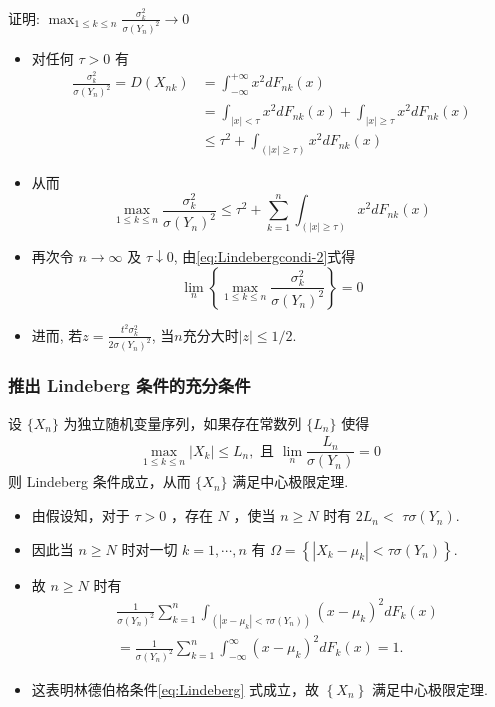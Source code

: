\begin{frame}{证明: $\max _{1 \leq k \leq n} \frac{\sigma_{k}^{2}}{\sigma(Y_n)^2}\rightarrow 0$}
	\vspace{-0.1cm}
\begin{itemize}
	\item 对任何 $\tau>0$ 有
\begin{align*}
	\frac{\sigma_{k}^{2}}{\sigma(Y_n)^2}=D\left(X_{n k}\right)&=\int_{-\infty}^{+\infty}x^2dF_{nk}(x)\\
	&=\int_{|x|<\tau}x^2dF_{nk}(x)+\int_{|x|\geq\tau}x^2dF_{nk}(x)\\
	&\leq \tau^{2}+\int_{(|x| \geq \tau)} x^{2} d F_{n k}(x)
\end{align*}
\item 从而
	\[
	\max _{1 \leq k \leq n} \frac{\sigma_{k}^{2}}{\sigma(Y_n)^2} \leq \tau^{2}+\sum_{k=1}^{n} \int_{(|x| \geq \tau)} x^{2} d F_{n k}(x)
	\]
\item
	再次令 $n \rightarrow \infty$ 及 $\tau \downarrow 0$, 由\eqref{eq:Lindebergcondi-2}式得
	\[
	\lim _{n}\left\{\max _{1 \leq k \leq n} \frac{\sigma_{k}^{2}}{\sigma(Y_n)^2}\right\}=0
	\]
	\item 进而, 若$z=\frac{t^{2} \sigma_{k}^{2}}{2 \sigma(Y_n)^2}$, 当$n$充分大时$|z| \leq 1 / 2$.
\end{itemize}

\end{frame}








\begin{frame}
	\frametitle{推出 Lindeberg 条件的充分条件}
	\begin{thm}
		设 $\{X_n\}$ 为独立随机变量序列，如果存在常数列 $\{L_n\}$ 使得
		\begin{eqnarray*}
			\max_{1\leq k\leq n}|X_k|\leq L_n, \mbox{ 且 } \lim_{n}\dfrac{L_n}{\sigma(Y_n)}=0
		\end{eqnarray*}
		则 Lindeberg 条件成立，从而 $\{X_n\}$ 满足中心极限定理.
	\end{thm}

\zheng
\begin{itemize}
	\item 由假设知，对于 $\tau>0$ ，存在 $N$ ，使当 $n \geq N$ 时有 $2 L_{n}<$ $\tau \sigma(Y_n)$.
	\item 因此当 $n \geq N$ 时对一切 $k=1, \cdots, n$ 有 $\Omega=\left\{\left|X_{k}-\mu_{k}\right|<\tau \sigma(Y_n)\right\}$.
	\item 故 $n \geq N$ 时有
	\begin{align*}
		&\frac{1}{\sigma(Y_n)^{2}} \sum_{k=1}^{n} \int_{\left(\left|x-\mu_{k}\right|<\tau \sigma(Y_n)\right)}\left(x-\mu_{k}\right)^{2} d F_{k}(x)\\
		&=\frac{1}{\sigma(Y_n)^{2}} \sum_{k=1}^{n} \int_{-\infty}^\infty\left(x-\mu_{k}\right)^{2} d F_{k}(x)=1 .
	\end{align*}
\item 这表明林德伯格条件\eqref{eq:Lindeberg} 式成立，故 $\left\{X_{n}\right\}$ 满足中心极限定理.
\end{itemize}




\end{frame}

